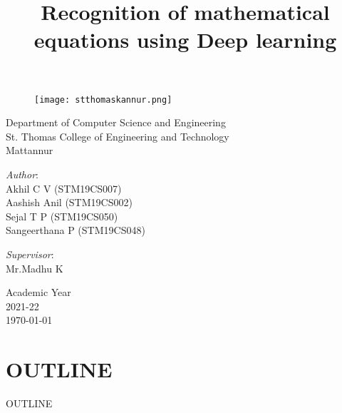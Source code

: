 \documentclass[svgnames,9pt]{beamer}
\title[Recognition of mathematical equations]{\huge \textbf{Recognition of mathematical equations using Deep learning}  } %
\author[Group 9]{}
\date{}
\begin{document}
	\begin{frame}
		
		\begin{figure}[h!]
			\texttt{[image: stthomaskannur.png]}
		\end{figure}
		
		\begin{center}      
			\begin{minipage}[b]{1.0\textwidth}
				\centering
				Department of Computer Science and Engineering\\
				St. Thomas College of Engineering and Technology\\Mattannur
			\end{minipage}%
		\end{center}
		
		\titlepage
		
		\begin{minipage}[t]{0.5\textwidth}
			\vspace{-2cm}
			\begin{flushleft}
				{ \textit{Author}:\vspace*{0.1cm} \\Akhil C V (STM19CS007)\\Aashish Anil (STM19CS002)\\Sejal T P (STM19CS050)\\Sangeerthana P (STM19CS048) } %
			\end{flushleft}
		\end{minipage}%
		\begin{minipage}[t]{0.5\textwidth}
			\vspace{-2cm}
			\begin{flushright}
				{\textit{Supervisor}:\vspace*{0.1cm} \\ Mr.Madhu K} %
			\end{flushright}    
		\end{minipage}%
		
		\vspace{-0.7cm}
		\begin{center}      
			\begin{minipage}[b]{0.5\textwidth}
				\centering  
				\small Academic Year \\ 2021-22\\ \today
			\end{minipage}%
		\end{center}    
	\end{frame}
\section{OUTLINE}
\begin{frame}{OUTLINE}
	\tableofcontents
\end{frame}
\end{document}
